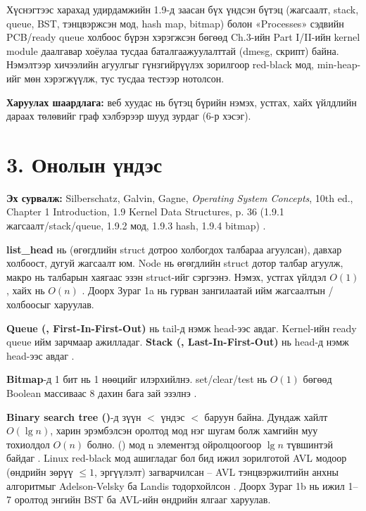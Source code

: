 Хүснэгтээс харахад удирдамжийн 1.9-д заасан бүх үндсэн бүтэц (жагсаалт, stack, queue, BST, тэнцвэржсэн мод, hash map, bitmap) болон «Processes» сэдвийн PCB/ready queue холбоос бүрэн хэрэгжсэн бөгөөд Ch.3-ийн Part I/II-ийн kernel module даалгавар хоёулаа тусдаа баталгаажуулалттай (dmesg, скрипт) байна. Нэмэлтээр хичээлийн агуулгыг гүнзгийрүүлэх зорилгоор red-black мод, min-heap-ийг мөн хэрэгжүүлж, тус тусдаа тестээр нотолсон.

\textbf{Харуулах шаардлага:} веб хуудас нь бүтэц бүрийн нэмэх, устгах, хайх үйлдлийн дараах төлөвийг граф хэлбэрээр шууд зурдаг (6-р хэсэг).

\section*{3. Онолын үндэс}

\textbf{Эх сурвалж:} Silberschatz, Galvin, Gagne, \textit{Operating System Concepts}, 10th ed., Chapter 1 Introduction, 1.9 Kernel Data Structures, p. 36 (1.9.1 жагсаалт/stack/queue, 1.9.2 мод, 1.9.3 hash, 1.9.4 bitmap) .

\textbf{list\_head} нь  (өгөгдлийн struct дотроо холбогдох талбараа агуулсан), давхар холбоост, дугуй жагсаалт юм. Node нь өгөгдлийн struct дотор  талбар агуулж,  макро нь талбарын хаягаас эзэн struct-ийг сэргээнэ. Нэмэх, устгах үйлдэл $O(1)$, хайх нь $O(n)$ . Доорх Зураг 1a нь гурван зангилаатай ийм жагсаалтын / холбоосыг харуулав.

\textbf{Queue (, First-In-First-Out)} нь tail-д нэмж head-ээс авдаг. Kernel-ийн ready queue ийм зарчмаар ажилладаг. \textbf{Stack (, Last-In-First-Out)} нь head-д нэмж head-ээс авдаг .

\textbf{Bitmap}-д 1 бит нь 1 нөөцийг илэрхийлнэ. set/clear/test нь $O(1)$ бөгөөд Boolean массиваас 8 дахин бага зай эзэлнэ .

\textbf{Binary search tree ()}-д зүүн $<$ үндэс $<$ баруун байна. Дундаж хайлт $O(\lg n)$, харин эрэмбэлсэн оролтод мод нэг шугам болж хамгийн муу тохиолдол $O(n)$ болно.  () мод n элементэд ойролцоогоор $\lg n$ түвшинтэй байдаг . Linux red-black мод ашигладаг бол бид ижил зорилготой AVL модоор (өндрийн зөрүү $\le 1$, эргүүлэлт) загварчилсан -- AVL тэнцвэржилтийн анхны алгоритмыг Adelson-Velsky ба Landis тодорхойлсон . Доорх Зураг 1b нь ижил 1--7 оролтод энгийн BST ба AVL-ийн өндрийн ялгааг харуулав.


